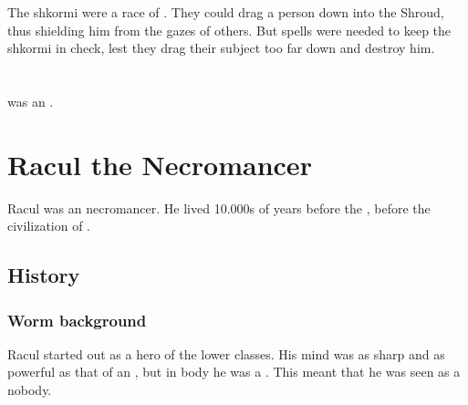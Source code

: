 The shkormi were a race of \daemons.
They could drag a person down into the Shroud, thus shielding him from the gazes of others. 
But spells were needed to keep the shkormi in check, lest they drag their subject too far down and destroy him. 















\section{\NathRamos}
\index{\NathRamos}
\NathRamos was an \ophidian.















\section{Racul the Necromancer}
Racul was an \ophidian necromancer. 
He lived 10.000s of years before the , before the civilization of .









\subsection{History}





\subsubsection{Worm background}
Racul started out as a hero of the lower classes. 
His mind was as sharp and as powerful as that of an , but in body he was a .
This meant that he was seen as a nobody. 





